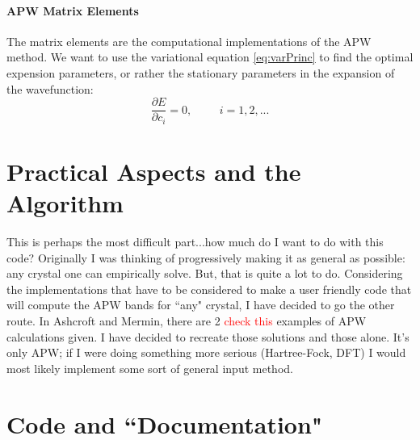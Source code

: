 \documentclass[11pt]{article}
\numberwithin{equation}{section}
\begin{document}
\paragraph{APW Matrix Elements}

The matrix elements are the computational implementations of the APW method. We want to use the variational equation \ref{eq:varPrinc} to find the optimal expension parameters, or rather the stationary parameters in the expansion of the wavefunction:
\begin{equation}
\frac{\partial E}{\partial c_i} = 0, \hspace{1cm} i = 1,2,...
\end{equation}


\section{Practical Aspects and the Algorithm}
This is perhaps the most difficult part...how much do I want to do with this code? Originally I was thinking of progressively making it as general as possible: any crystal one can empirically solve. But, that is quite a lot to do. Considering the implementations that have to be considered to make a user friendly code that will compute the APW bands for ``any" crystal, I have decided to go the other route. In Ashcroft and Mermin, there are 2 \textcolor{red}{check this} examples of APW calculations given. I have decided to recreate those solutions and those alone. It's only APW; if I were doing something more serious (Hartree-Fock, DFT) I would most likely implement some sort of general input method.

\section{Code and ``Documentation"}
\end{document}
